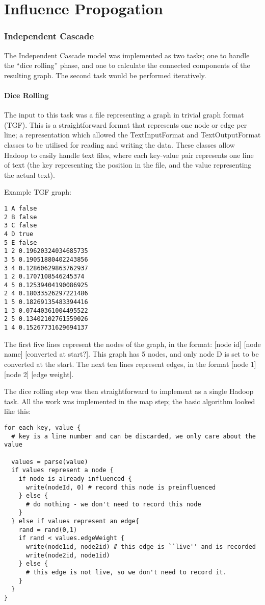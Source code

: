 \section{Influence Propogation}

\subsubsection{Independent Cascade}

The Independent Cascade model was implemented as two tasks; one to handle the ``dice rolling'' phase, and one to calculate the connected components of the resulting graph. The second task would be performed iteratively.

\paragraph{Dice Rolling}

The input to this task was a file representing a graph in trivial graph format (TGF). This is a straightforward format that represents one node or edge per line; a representation which allowed the TextInputFormat and TextOutputFormat classes to be utilised for reading and writing the data. These classes allow Hadoop to easily handle text files, where each key-value pair represents one line of text (the key representing the position in the file, and the value representing the actual text).

Example TGF graph:

\begin{verbatim}
1 A false
2 B false
3 C false
4 D true
5 E false
1 2 0.19620324034685735
3 5 0.19051880402243856
3 4 0.12860629863762937
1 2 0.1707108546245374
4 5 0.12539404190086925
2 4 0.18033526297221486
1 5 0.18269135483394416
1 3 0.07440361004495522
2 5 0.13402102761559026
1 4 0.15267731629694137
\end{verbatim}

The first five lines represent the nodes of the graph, in the format: [node id] [node name] [converted at start?]. This graph has 5 nodes, and only node D is set to be converted at the start. The next ten lines represent edges, in the format [node 1] [node 2] [edge weight].

The dice rolling step was then straightforward to implement as a single Hadoop task. All the work was implemented in the map step; the basic algorithm looked like this:

\begin{verbatim}
for each key, value {
  # key is a line number and can be discarded, we only care about the value

  values = parse(value)
  if values represent a node {
    if node is already influenced {
      write(nodeId, 0) # record this node is preinfluenced
    } else {
      # do nothing - we don't need to record this node
    }
  } else if values represent an edge{
    rand = rand(0,1)
    if rand < values.edgeWeight {
      write(node1id, node2id) # this edge is ``live'' and is recorded
      write(node2id, node1id)
    } else {
      # this edge is not live, so we don't need to record it.
    }
  }
}
\end{verbatim}

